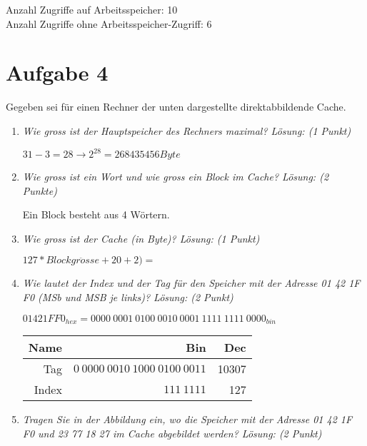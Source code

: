 \documentclass[10pt]{article}
\begin{document}
\begin{enumerate}[label=\alph*)]
		Anzahl Zugriffe auf Arbeitsspeicher: 10 \\
		Anzahl Zugriffe ohne Arbeitsspeicher-Zugriff: 6
\end{enumerate}

\newpage
\section*{Aufgabe 4}
Gegeben sei für einen Rechner der unten dargestellte direktabbildende Cache. 
\begin{enumerate}[label=\alph*)]
	\item
		\textit{Wie gross ist der Hauptspeicher des Rechners maximal? Lösung: (1 Punkt)}
		
		 $31 - 3 = 28 \rightarrow 2^{28} = 268435456 Byte$
	\item
		\textit{Wie gross ist ein Wort und wie gross ein Block im Cache? Lösung: (2 Punkte)}
		
		Ein Block besteht aus 4 Wörtern.
	\item
		\textit{Wie gross ist der Cache (in Byte)? Lösung: (1 Punkt)}
		
		$127 * Blockgr\ddot{o}sse + 20 + 2) = $
		
	\item
		\textit{Wie lautet der Index und der Tag für den Speicher mit der Adresse 01 42 1F F0 (MSb und MSB je links)? Lösung: (2 Punkt)}
		
		$01 42 1F F0_{hex} = 0000\:0001\:0100\:0010\:0001\:1111\:1111\:0000_{bin}$
		
		\begin{tabular}{r | r | r}
			Name & Bin & Dec\\
			\hline
			Tag & $0\:0000\:0010\:1000\:0100\:0011$ & 10307\\
			Index & $111\:1111$ & 127\\
		\end{tabular}
		
	\item
		\textit{Tragen Sie in der Abbildung ein, wo die Speicher mit der Adresse 01 42 1F F0 und 23 77 18 27 im Cache abgebildet werden? Lösung: (2 Punkt)}
		

\end{enumerate}
\end{document}
